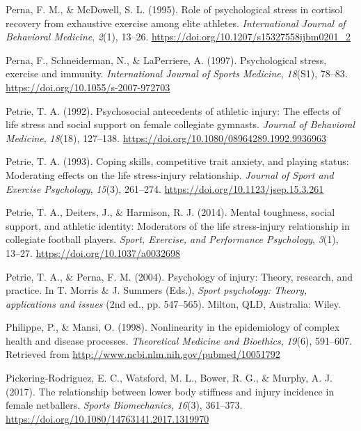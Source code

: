 \documentclass[man,floatsintext]{apa6}
\begin{document}
\leavevmode\hypertarget{ref-Perna1995}{}%
Perna, F. M., \& McDowell, S. L. (1995). Role of psychological stress in cortisol recovery from exhaustive exercise among elite athletes. \emph{International Journal of Behavioral Medicine}, \emph{2}(1), 13--26. \url{https://doi.org/10.1207/s15327558ijbm0201_2}

\leavevmode\hypertarget{ref-Perna1997}{}%
Perna, F., Schneiderman, N., \& LaPerriere, A. (1997). Psychological stress, exercise and immunity. \emph{International Journal of Sports Medicine}, \emph{18}(S1), 78--83. \url{https://doi.org/10.1055/s-2007-972703}

\leavevmode\hypertarget{ref-Petrie1992}{}%
Petrie, T. A. (1992). Psychosocial antecedents of athletic injury: The effects of life stress and social support on female collegiate gymnasts. \emph{Journal of Behavioral Medicine}, \emph{18}(18), 127--138. \url{https://doi.org/10.1080/08964289.1992.9936963}

\leavevmode\hypertarget{ref-Petrie1993}{}%
Petrie, T. A. (1993). Coping skills, competitive trait anxiety, and playing status: Moderating effects on the life stress-injury relationship. \emph{Journal of Sport and Exercise Psychology}, \emph{15}(3), 261--274. \url{https://doi.org/10.1123/jsep.15.3.261}

\leavevmode\hypertarget{ref-Petrie2014}{}%
Petrie, T. A., Deiters, J., \& Harmison, R. J. (2014). Mental toughness, social support, and athletic identity: Moderators of the life stress-injury relationship in collegiate football players. \emph{Sport, Exercise, and Performance Psychology}, \emph{3}(1), 13--27. \url{https://doi.org/10.1037/a0032698}

\leavevmode\hypertarget{ref-Perna2004}{}%
Petrie, T. A., \& Perna, F. M. (2004). Psychology of injury: Theory, research, and practice. In T. Morris \& J. Summers (Eds.), \emph{Sport psychology: Theory, applications and issues} (2nd ed., pp. 547--565). Milton, QLD, Australia: Wiley.

\leavevmode\hypertarget{ref-Philippe1998}{}%
Philippe, P., \& Mansi, O. (1998). Nonlinearity in the epidemiology of complex health and disease processes. \emph{Theoretical Medicine and Bioethics}, \emph{19}(6), 591--607. Retrieved from \url{http://www.ncbi.nlm.nih.gov/pubmed/10051792}

\leavevmode\hypertarget{ref-PickeringRodriguez2017}{}%
Pickering-Rodriguez, E. C., Watsford, M. L., Bower, R. G., \& Murphy, A. J. (2017). The relationship between lower body stiffness and injury incidence in female netballers. \emph{Sports Biomechanics}, \emph{16}(3), 361--373. \url{https://doi.org/10.1080/14763141.2017.1319970}
\end{document}
